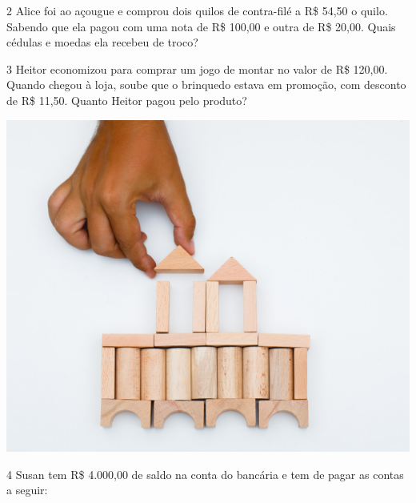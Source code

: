 \num{2} Alice foi ao açougue e comprou dois quilos de contra-filé
a R\$ 54,50 o quilo. Sabendo que ela pagou com uma nota de R\$ 100,00 
e outra de R\$ 20,00. Quais cédulas e moedas ela recebeu de troco?


\num{3} Heitor economizou para comprar um jogo de montar no valor de R\$ 120,00.
Quando chegou à loja, soube que o brinquedo estava em promoção, com desconto de R\$ 11,50. Quanto Heitor pagou pelo produto?

\begin{center}
\includegraphics[width=.45\textwidth]{media/image37a.jpg}
\end{center}

\num{4} Susan tem R\$ 4.000,00 de saldo na conta do bancária e tem de pagar as contas a seguir: 

